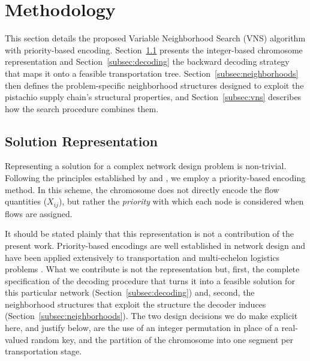 \documentclass[preprint,12pt,authoryear]{elsarticle}
\begin{document}
\section{Methodology}
\label{sec:methodology}

This section details the proposed Variable Neighborhood Search (VNS) algorithm with priority-based encoding. Section~\ref{subsec:solution_rep} presents the integer-based
chromosome representation and Section~\ref{subsec:decoding} the backward decoding strategy that maps it onto a feasible transportation tree. Section~\ref{subsec:neighborhoods}
then defines the problem-specific neighborhood structures designed to exploit the pistachio supply chain's structural properties, and Section~\ref{subsec:vns} describes how the
search procedure combines them.

\subsection{Solution Representation}
\label{subsec:solution_rep}

Representing a solution for a complex network design problem is non-trivial. Following the principles established by \citet{gen2006} and \cite{rajabi2023},
we employ a priority-based encoding method. In this scheme, the chromosome does not directly encode the flow quantities ($X_{ij}$), but rather the \textit{priority}
with which each node is considered when flows are assigned.

It should be stated plainly that this representation is not a contribution of the present work. Priority-based encodings are well established in network design and have been applied
extensively to transportation and multi-echelon logistics problems \citep{gen2006, altiparmak2006}. What we contribute is not the representation but, first, the complete specification
of the decoding procedure that turns it into a feasible solution for this particular network (Section~\ref{subsec:decoding}) and, second, the neighborhood structures that exploit the
structure the decoder induces (Section~\ref{subsec:neighborhoods}). The two design decisions we do make explicit here, and justify below, are the use of an integer permutation in place
of a real-valued random key, and the partition of the chromosome into one segment per transportation stage.
\end{document}
